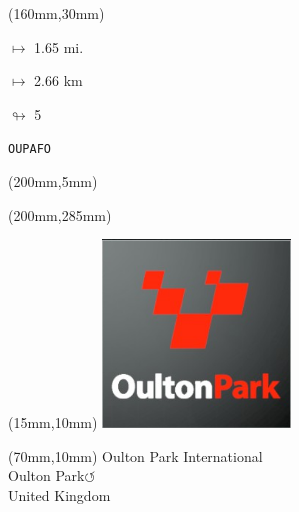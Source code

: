 \begin{textblock*}{40mm}(160mm,30mm)%
\Large
\par$\mapsto$ 1.65 mi.
\par$\mapsto$ 2.66 km
\par$\looparrowright$ 5
\par\hfill\tiny\tt OUPAFO\\
\end{textblock*}
\begin{textblock*}{20mm}(200mm,5mm)%
\fbox{\thepage}
\label{OUPAFO}
\end{textblock*}
\begin{textblock*}{20mm}(200mm,285mm)%
\fbox{\thepage}
\end{textblock*}

\null\newpage
\begin{textblock*}{50mm}(15mm,10mm)%
\includegraphics[width=50mm]{LG/2015-05-20_00091.png}
\end{textblock*}
\begin{textblock*}{130mm}(70mm,10mm)%
{\fontsize{20}{20}\selectfont Oulton Park International\\}
{\fontsize{16}{16}\selectfont Oulton Park\hfill \huge$\circlearrowleft$\\}
{\fontsize{12}{12}\selectfont United Kingdom\\}
\end{textblock*}
